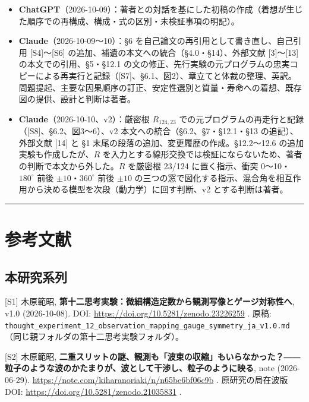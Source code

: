 \documentclass[
  a4paper,
]{ltjsarticle}
\providecommand{\tightlist}{%
  \setlength{\itemsep}{0pt}\setlength{\parskip}{0pt}}
\begin{document}
\begin{itemize}
\tightlist
\item
  \textbf{ChatGPT}（2026-10-09）：著者との対話を基にした初稿の作成（着想が生じた順序での再構成、構成・式の区別・未検証事項の明記）。
\item
  \textbf{Claude}（2026-10-09〜10）：§6
  を自己論文の再引用として書き直し、自己引用 {[}S4{]}〜{[}S6{]}
  の追加、補遺の本文への統合（§4.0・§14）、外部文献 {[}3{]}〜{[}13{]}
  の本文での引用、§5・§12.1
  の文の修正、先行実験の元プログラムの忠実コピーによる再実行と記録（{[}S7{]}、§6.1、図2）、章立てと体裁の整理、英訳。問題提起、主要な因果順序の訂正、安定性選別と質量・寿命への着想、既存図の提供、設計と判断は著者。
\item
  \textbf{Claude}（2026-10-10、v2）：厳密根 \(R_{124,23}\)
  での元プログラムの再走行と記録（{[}S8{]}、§6.2、図3〜6）、v2
  本文への統合（§6.2、§7・§12.1・§13 の追記）、外部文献 {[}14{]} と §1
  末尾の段落の追加、変更履歴の作成。§12.2〜12.6
  の追加実験も作成したが、\(R\)
  を入力とする線形交換では検証にならないため、著者の判断で本文から外した。\(R\)
  を厳密根 23/124 に置く指示、衝突 0〜10・\(180^\circ\) 前後
  \(\pm10\)・\(360^\circ\) 前後 \(\pm10\)
  の三つの窓で図化する指示、混合角を相互作用から決める模型を次段（動力学）に回す判断、v2
  とする判断は著者。
\end{itemize}

\begin{center}\rule{0.5\linewidth}{0.5pt}\end{center}

\section{参考文献}\label{ux53c2ux8003ux6587ux732e}

\subsection{本研究系列}\label{ux672cux7814ux7a76ux7cfbux5217}

{[}S1{]} 木原範昭,
\textbf{第十二思考実験：微細構造定数から観測写像とゲージ対称性へ}, v1.0
(2026-10-08). DOI: \url{https://doi.org/10.5281/zenodo.23226259} . 原稿:
\texttt{thought\_\allowbreak{}experiment\_\allowbreak{}12\_\allowbreak{}observation\_\allowbreak{}mapping\_\allowbreak{}gauge\_\allowbreak{}symmetry\_\allowbreak{}ja\_\allowbreak{}v1.0.md}（同じ親フォルダの第十二思考実験フォルダ）。

{[}S2{]} 木原範昭,
\textbf{二重スリットの謎、観測も「波束の収縮」もいらなかった？――粒子のような波のかたまりが、波として干渉し、粒子のように映る},
note (2026-06-29). \url{https://note.com/kiharanoriaki/n/n65be6bf06c9b} .
原研究の局在波版 DOI: \url{https://doi.org/10.5281/zenodo.21035831} .
\end{document}

